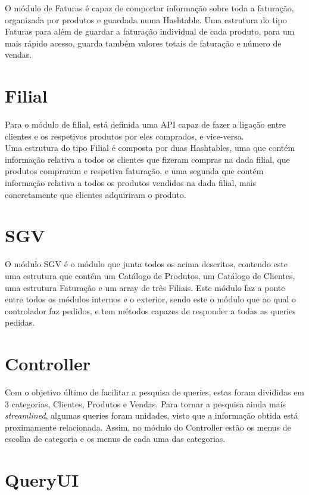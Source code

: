 \documentclass[a4paper]{report}
\begin{document}
O módulo de Faturas é capaz de comportar informação sobre toda a faturação,
organizada por produtos e guardada numa Hashtable. Uma estrutura do tipo Faturas
para além de guardar a faturação individual de cada produto, para um mais rápido 
acesso, guarda também valores totais de faturação e número de vendas.

\section{Filial}

Para o módulo de filial, está definida uma API capaz de fazer a ligação entre 
clientes e os respetivos produtos por eles comprados, e vice-versa.\\
Uma estrutura do tipo Filial é composta por duas Hashtables, uma que contém
informação relativa a todos os clientes que fizeram compras na dada filial, 
que produtos compraram e respetiva faturação, e uma segunda que contém 
informação relativa a todos os produtos vendidos na dada filial, mais 
concretamente que clientes adquiriram o produto.

\section{SGV}

O módulo SGV é o módulo que junta todos os acima descritos, contendo este uma estrutura
que contém um Catálogo de Produtos, um Catálogo de Clientes, uma estrutura Faturação e 
um array de três Filiais. Este módulo faz a ponte entre todos os módulos internos e o 
exterior, sendo este o módulo que ao qual o controlador faz pedidos, e tem 
métodos capazes de responder a todas as queries pedidas.

\section{Controller}

Com o objetivo último de facilitar a pesquisa de queries, estas foram divididas em 3 categorias,
Clientes, Produtos e Vendas. Para tornar a pesquisa ainda mais \textit{streamlined},
algumas queries foram unidades, visto que a informação obtida está proximamente relacionada.
Assim, no módulo do Controller estão os menus de escolha de categoria
e os menus de cada uma das categorias.

\section{QueryUI}
\end{document}
